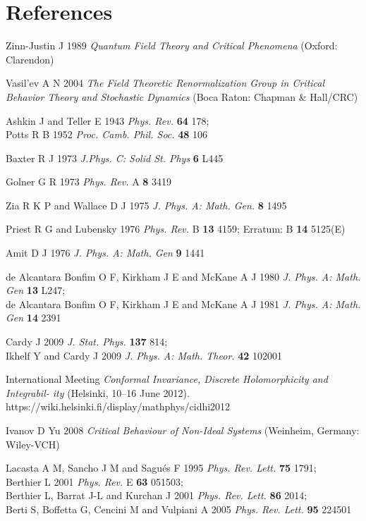 \section*{References}
\begin{thebibliography}{99}

 Zinn-Justin J 1989 {\it Quantum Field Theory and Critical
Phenomena} (Oxford: Clarendon)

 Vasil'ev A N 2004 {\it The Field Theoretic Renormalization
Group in Critical Behavior Theory and Stochastic Dynamics}
(Boca Raton: Chapman \& Hall/CRC)

 Ashkin J and Teller E 1943 {\it Phys. Rev.}
{\bf 64} 178;\\
Potts R B 1952
{\it Proc. Camb. Phil. Soc.}
{\bf 48} 106

 Baxter R J 1973 {\it J.Phys. C: Solid St. Phys}
{\bf 6} L445

 Golner G R 1973 {\it Phys. Rev.} A
{\bf 8} 3419

 Zia R K P and Wallace D J 1975 {\it J. Phys. A: Math. Gen.}
{\bf 8} 1495

 Priest R G and Lubensky 1976 {\it Phys. Rev.} B
{\bf 13} 4159; Erratum: B {\bf 14} 5125(E)

 Amit D J 1976 {\it J. Phys. A: Math. Gen}
{\bf 9} 1441


de Alcantara Bonfim O F, Kirkham J E and McKane A J 1980
{\it J. Phys. A: Math. Gen}
{\bf 13} L247;\\
de Alcantara Bonfim O F, Kirkham J E and McKane A J 1981
{\it J. Phys. A: Math. Gen}
{\bf 14} 2391


Cardy J 2009
{\it J. Stat. Phys.}
{\bf 137} 814;\\
Ikhelf Y and Cardy J 2009
{\it J. Phys. A: Math. Theor.}
{\bf 42} 102001

International Meeting {\it Conformal Invariance, Discrete Holomorphicity and Integrabil-
ity } (Helsinki, 10–16 June 2012). https://wiki.helsinki.fi/display/mathphys/cidhi2012


Ivanov D Yu 2008 {\it Critical Behaviour of Non-Ideal Systems} (Weinheim, Germany: Wiley-VCH)

Lacasta A M, Sancho J M and Sagu\'{e}s F 1995
{\it Phys. Rev. Lett.} 
{\bf 75} 1791;\\
Berthier L 2001 
{\it Phys. Rev.} E 
{\bf 63} 051503;\\
Berthier L, Barrat J-L and Kurchan J 2001 
{\it Phys. Rev. Lett.}
{\bf 86} 2014;\\
Berti S, Boffetta G, Cencini M and Vulpiani A 2005 
{\it Phys. Rev. Lett.}
{\bf 95} 224501


\end{thebibliography}
